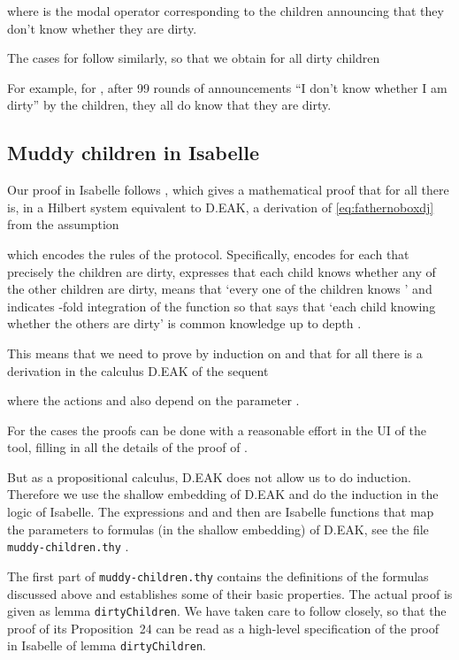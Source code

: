 \documentclass[runningheads,a4paper]{llncs}
\begin{document}
where  is the modal operator corresponding to the children announcing that they don't know whether they are dirty. 

\medskip\noindent The cases for  follow similarly, so that we obtain for all dirty children 

For example, for , after 99 rounds of announcements  ``I don't know whether I am dirty'' by the children, they all do know that they are dirty. 

\subsection{Muddy children in Isabelle}
Our proof in Isabelle follows \cite[Prop.24]{MaPS14}, which gives a mathematical proof that for all  there is, in a Hilbert system equivalent to D.EAK, a derivation  of 
\eqref{eq:fathernoboxdj} from the assumption
\newcommand{\dirty}{\textsf{dirty}}
\newcommand{\E}{\textsf{E}}
\newcommand{\vision}{\textsf{vision}}

which encodes the rules of the protocol. Specifically,  encodes for each  that precisely the children  are dirty,  expresses that each child knows whether any of the other children are dirty, 
 means that `every one of the  children knows ' and  indicates -fold integration of the function  so that  says that `each child knowing whether the others are dirty' is common knowledge up to depth .

\medskip\noindent This means that we need to prove by induction on  and  that for  all  there is a derivation in the calculus D.EAK of the sequent 

where the actions  and  also depend on the parameter .

\medskip\noindent For the cases  the proofs can be done with a reasonable effort in the UI of the tool, filling in all the details of the proof of \cite{MaPS14}. 	

\medskip\noindent But as a propositional calculus, D.EAK does not allow us to do  induction. Therefore we use the shallow embedding of D.EAK  and do the induction in the logic of Isabelle. The expressions  and  and  then are Isabelle functions that map the parameters  to formulas (in the shallow embedding) of D.EAK, see the file \texttt{muddy-children.thy} \cite{Balco:MC}.

\medskip\noindent The first part of  \texttt{muddy-children.thy} contains the definitions of the formulas discussed above and establishes some of their basic properties. The actual proof is given as lemma \texttt{dirtyChildren}. We have taken care to follow \cite{MaPS14} closely, so that the proof of its Proposition~24 can be read as a high-level specification of the proof in Isabelle of lemma \texttt{dirtyChildren}. 
\end{document}
